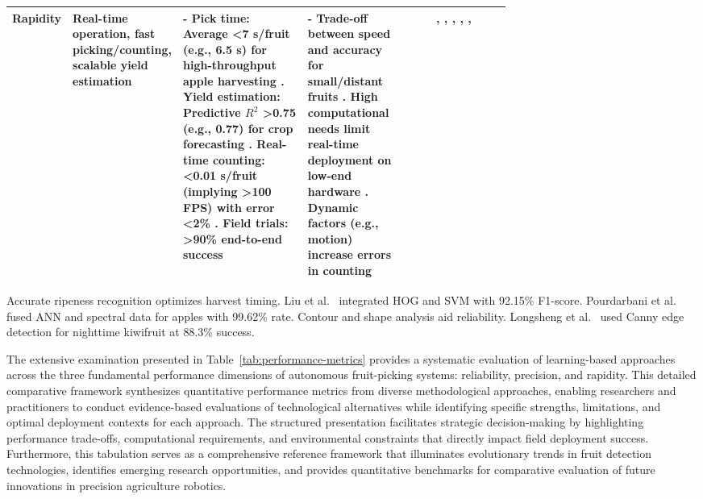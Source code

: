 \documentclass{ieeeaccess}
\begin{document}
\begin{table}[htbp]
\begin{tabularx}{\textwidth}{>{\raggedright\arraybackslash}m{0.12\linewidth}>{\raggedright\arraybackslash}m{0.15\linewidth}>{\raggedright\arraybackslash}m{0.25\linewidth}>{\raggedright\arraybackslash}m{0.20\linewidth}c}
\textbf{Rapidity} & Real-time operation, fast picking/counting, scalable yield estimation & - Pick time: Average <7 s/fruit (e.g., 6.5 s) for high-throughput apple harvesting \cite{kang2020real}. Yield estimation: Predictive 
$R^2$ >0.75 (e.g., 0.77) for crop forecasting \cite{underwood2016mapping}. Real-time counting: <0.01 s/fruit (implying >100 FPS) with error <2\% \cite{altaheri2019date}. Field trials: >90\% end-to-end success \cite{birrell2020field} & - Trade-off between speed and accuracy for small/distant fruits \cite{kang2020real}. High computational needs limit real-time deployment on low-end hardware \cite{altaheri2019date}. Dynamic factors (e.g., motion) increase errors in counting \cite{underwood2016mapping} & \cite{underwood2016mapping}, \cite{lin2019guava}, \cite{kang2019fruit}, \cite{kang2020real}, \cite{altaheri2019date}, \cite{birrell2020field} \\ \bottomrule
\end{tabularx}
\end{table}
\fi

Accurate ripeness recognition optimizes harvest timing. 
Liu et al.~\cite{liu2019mature} integrated HOG and SVM with 92.15\% F1-score. 
Pourdarbani et al.~\cite{pourdarbani2020automatic} fused ANN and spectral data for apples with 99.62\% rate.
Contour and shape analysis aid reliability. 
Longsheng et al.~\cite{longsheng2015kiwifruit} used Canny edge detection for nighttime kiwifruit at 88.3\% success.


The extensive examination presented in Table~\ref{tab:performance-metrics} provides a systematic evaluation of learning-based approaches across the three fundamental performance dimensions of autonomous fruit-picking systems: reliability, precision, and rapidity. This detailed comparative framework synthesizes quantitative performance metrics from diverse methodological approaches, enabling researchers and practitioners to conduct evidence-based evaluations of technological alternatives while identifying specific strengths, limitations, and optimal deployment contexts for each approach. The structured presentation facilitates strategic decision-making by highlighting performance trade-offs, computational requirements, and environmental constraints that directly impact field deployment success. Furthermore, this tabulation serves as a comprehensive reference framework that illuminates evolutionary trends in fruit detection technologies, identifies emerging research opportunities, and provides quantitative benchmarks for comparative evaluation of future innovations in precision agriculture robotics.
\end{document}
